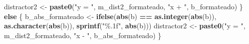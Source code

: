 \documentclass[
]{article}
\newenvironment{Shaded}{\begin{snugshade}}{\end{snugshade}}
\newcommand{\ControlFlowTok}[1]{\textcolor[rgb]{0.13,0.29,0.53}{\textbf{#1}}}
\newcommand{\FunctionTok}[1]{\textcolor[rgb]{0.13,0.29,0.53}{\textbf{#1}}}
\newcommand{\NormalTok}[1]{#1}
\newcommand{\OtherTok}[1]{\textcolor[rgb]{0.56,0.35,0.01}{#1}}
\newcommand{\SpecialCharTok}[1]{\textcolor[rgb]{0.81,0.36,0.00}{\textbf{#1}}}
\newcommand{\StringTok}[1]{\textcolor[rgb]{0.31,0.60,0.02}{#1}}
\begin{document}
\begin{Shaded}
\begin{Highlighting}[]
\NormalTok{    distractor2 }\OtherTok{\textless{}{-}} \FunctionTok{paste0}\NormalTok{(}\StringTok{"y = "}\NormalTok{, m\_dist2\_formateado, }\StringTok{"x + "}\NormalTok{, b\_formateado)}
\NormalTok{  \} }\ControlFlowTok{else}\NormalTok{ \{}
\NormalTok{    b\_abs\_formateado }\OtherTok{\textless{}{-}} \FunctionTok{ifelse}\NormalTok{(}\FunctionTok{abs}\NormalTok{(b) }\SpecialCharTok{==} \FunctionTok{as.integer}\NormalTok{(}\FunctionTok{abs}\NormalTok{(b)), }
                               \FunctionTok{as.character}\NormalTok{(}\FunctionTok{abs}\NormalTok{(b)), }
                               \FunctionTok{sprintf}\NormalTok{(}\StringTok{"\%.1f"}\NormalTok{, }\FunctionTok{abs}\NormalTok{(b)))}
\NormalTok{    distractor2 }\OtherTok{\textless{}{-}} \FunctionTok{paste0}\NormalTok{(}\StringTok{"y = "}\NormalTok{, m\_dist2\_formateado, }\StringTok{"x {-} "}\NormalTok{, b\_abs\_formateado)}
\NormalTok{  \}}
  

\end{Highlighting}
\end{Shaded}
\end{document}
